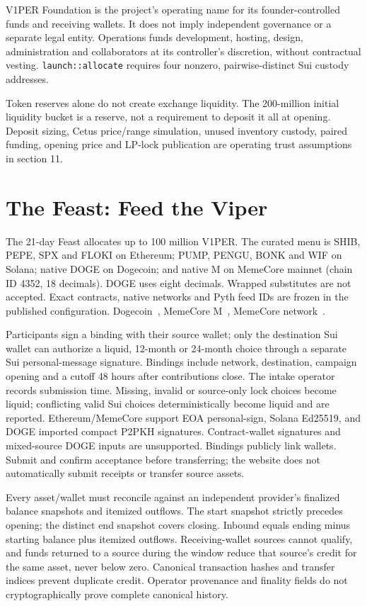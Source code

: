 \documentclass[11pt]{article}
\newcommand{\VOnePER}{\texorpdfstring{V\textcolor{brandone}{1}PER}{V1PER}}
\begin{document}
\VOnePER{} Foundation is the project's operating name for its founder-controlled funds and receiving wallets. It does not imply independent governance or a separate legal entity. Operations funds development, hosting, design, administration and collaborators at its controller's discretion, without contractual vesting. \texttt{launch::allocate} requires four nonzero, pairwise-distinct Sui custody addresses.

Token reserves alone do not create exchange liquidity. The 200-million initial liquidity bucket is a reserve, not a requirement to deposit it all at opening. Deposit sizing, Cetus price/range simulation, unused inventory custody, paired funding, opening price and LP-lock publication are operating trust assumptions in section 11.

\section{The Feast: Feed the Viper}

The 21-day Feast allocates up to 100 million \VOnePER{}. The curated menu is SHIB, PEPE, SPX and FLOKI on Ethereum; PUMP, PENGU, BONK and WIF on Solana; native DOGE on Dogecoin; and native M on MemeCore mainnet (chain ID 4352, 18 decimals). DOGE uses eight decimals. Wrapped substitutes are not accepted. Exact contracts, native networks and Pyth feed IDs are frozen in the published configuration. Dogecoin~\cite{ref3}, MemeCore M~\cite{ref4}, MemeCore network~\cite{ref5}.

Participants sign a binding with their source wallet; only the destination Sui wallet can authorize a liquid, 12-month or 24-month choice through a separate Sui personal-message signature. Bindings include network, destination, campaign opening and a cutoff 48 hours after contributions close. The intake operator records submission time. Missing, invalid or source-only lock choices become liquid; conflicting valid Sui choices deterministically become liquid and are reported. Ethereum/MemeCore support EOA personal-sign, Solana Ed25519, and DOGE imported compact P2PKH signatures. Contract-wallet signatures and mixed-source DOGE inputs are unsupported. Bindings publicly link wallets. Submit and confirm acceptance before transferring; the website does not automatically submit receipts or transfer source assets.

Every asset/wallet must reconcile against an independent provider's finalized balance snapshots and itemized outflows. The start snapshot strictly precedes opening; the distinct end snapshot covers closing. Inbound equals ending minus starting balance plus itemized outflows. Receiving-wallet sources cannot qualify, and funds returned to a source during the window reduce that source's credit for the same asset, never below zero. Canonical transaction hashes and transfer indices prevent duplicate credit. Operator provenance and finality fields do not cryptographically prove complete canonical history.
\end{document}
